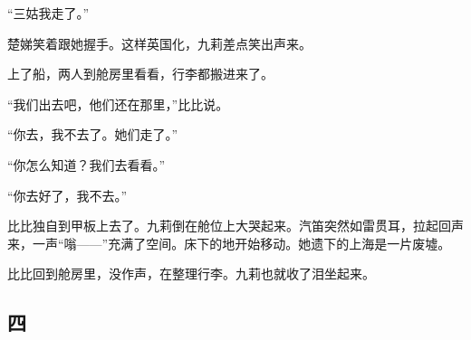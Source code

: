 \par “三姑我走了。”
\par 楚娣笑着跟她握手。这样英国化，九莉差点笑出声来。
\par 上了船，两人到舱房里看看，行李都搬进来了。
\par “我们出去吧，他们还在那里，”比比说。
\par “你去，我不去了。她们走了。”
\par “你怎么知道？我们去看看。”
\par “你去好了，我不去。”
\par 比比独自到甲板上去了。九莉倒在舱位上大哭起来。汽笛突然如雷贯耳，拉起回声来，一声“嗡——”充满了空间。床下的地开始移动。她遗下的上海是一片废墟。
\par 比比回到舱房里，没作声，在整理行李。九莉也就收了泪坐起来。


\subsection{四}

